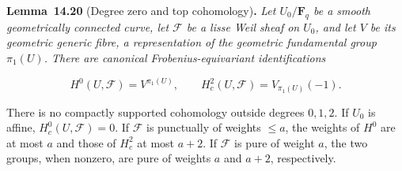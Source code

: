 \documentclass[11pt]{article}
\newenvironment{bpstatement}[2]{\par\addvspace{0.6\baselineskip}\noindent\textbf{#1}#2\textbf{.}\enspace\ignorespaces}
  {\par\addvspace{0.4\baselineskip}}
\newenvironment{bpstatementit}[2]{\begin{bpstatement}{#1}{#2}\itshape\ignorespaces}{\end{bpstatement}}
\begin{document}
\label{bp104}%
\begin{bpstatementit}{Lemma~14.20}{ (Degree zero and top cohomology)}
Let \(U_0/\mathbf F_q\) be a smooth geometrically connected curve, let \(\mathcal F\) be a lisse Weil sheaf on \(U_0\), and let \(V\) be its geometric generic fibre, a representation of the geometric fundamental group \(\pi_1(U)\).  There are canonical Frobenius-equivariant identifications

\[
H^0(U,\mathcal F)=V^{\pi_1(U)},\qquad
H_c^2(U,\mathcal F)=V_{\pi_1(U)}(-1).
\]

There is no compactly supported cohomology outside degrees \(0,1,2\). If \(U_0\) is affine, \(H_c^0(U,\mathcal F)=0\). If \(\mathcal F\) is punctually of weights \(\le a\), the weights of \(H^0\) are at most \(a\) and those of \(H_c^2\) at most \(a+2\).  If \(\mathcal F\) is pure of weight \(a\), the two groups, when nonzero, are pure of weights \(a\) and \(a+2\), respectively.
\end{bpstatementit}
\end{document}
